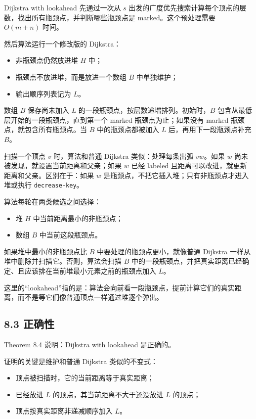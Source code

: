 \documentclass[UTF8]{ctexart}
\begin{document}
Dijkstra with lookahead 先通过一次从 \(s\) 出发的广度优先搜索计算每个顶点的层数，找出所有瓶颈点，并判断哪些瓶颈点是 marked。这个预处理需要 \(O(m+n)\) 时间。

然后算法运行一个修改版的 Dijkstra：

\begin{itemize}
  \item 非瓶颈点仍然放进堆 \(H\) 中；
  \item 瓶颈点不放进堆，而是放进一个数组 \(B\) 中单独维护；
  \item 输出顺序列表记为 \(L\)。
\end{itemize}

数组 \(B\) 保存尚未加入 \(L\) 的一段瓶颈点，按层数递增排列。初始时，\(B\) 包含从最低层开始的一段瓶颈点，直到第一个 marked 瓶颈点为止；如果没有 marked 瓶颈点，就包含所有瓶颈点。当 \(B\) 中的瓶颈点都被加入 \(L\) 后，再用下一段瓶颈点补充 \(B\)。

扫描一个顶点 \(v\) 时，算法和普通 Dijkstra 类似：处理每条出弧 \(vw\)。如果 \(w\) 尚未被发现，就设置当前距离和父亲；如果 \(w\) 已经 labeled 且距离可以改进，就更新距离和父亲。区别在于：如果 \(w\) 是瓶颈点，不把它插入堆；只有非瓶颈点才进入堆或执行 \texttt{decrease-key}。

算法每轮在两类候选之间选择：

\begin{itemize}
  \item 堆 \(H\) 中当前距离最小的非瓶颈点；
  \item 数组 \(B\) 中当前这段瓶颈点。
\end{itemize}

如果堆中最小的非瓶颈点比 \(B\) 中要处理的瓶颈点更小，就像普通 Dijkstra 一样从堆中删除并扫描它。否则，算法会扫描 \(B\) 中的一段瓶颈点，并把真实距离已经确定、且应该排在当前堆最小元素之前的瓶颈点加入 \(L\)。

这里的“lookahead”指的是：算法会向前看一段瓶颈点，提前计算它们的真实距离，而不是等它们像普通顶点一样通过堆逐个弹出。

\subsection*{8.3 正确性}

Theorem 8.4 说明：Dijkstra with lookahead 是正确的。

证明的关键是维护和普通 Dijkstra 类似的不变式：

\begin{itemize}
  \item 顶点被扫描时，它的当前距离等于真实距离；
  \item 已经放进 \(L\) 的顶点，其当前距离不大于还没放进 \(L\) 的顶点；
  \item 顶点按真实距离非递减顺序加入 \(L\)。
\end{itemize}
\end{document}
